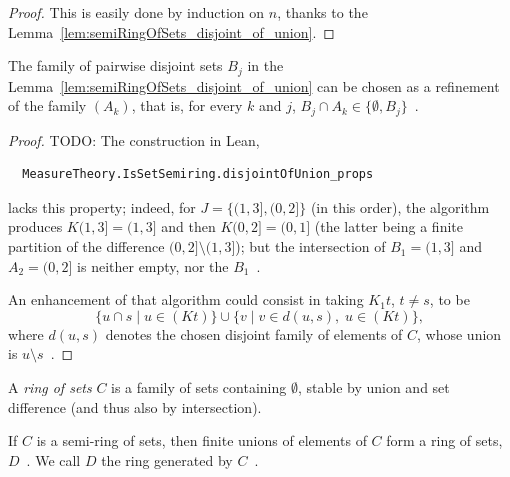 \begin{proof}\leanok
This is easily done by induction on $n$, thanks to the Lemma~\ref{lem:semiRingOfSets_disjoint_of_union}.
\end{proof}

\begin{lemma}\label{lem:semiRingOfSets_disjoint_of_union_finer}
  The family of pairwise disjoint sets $B_j$
  in the Lemma~\ref{lem:semiRingOfSets_disjoint_of_union}
  can be chosen
  as a refinement of the family $(A_k)$, that is,
  for every $k$ and $j$,
  $B_j \cap A_k \in \{\emptyset, B_j\}$~.
\end{lemma}

\begin{proof}
  TODO: The construction in Lean,
\begin{verbatim}
  MeasureTheory.IsSetSemiring.disjointOfUnion_props
\end{verbatim}
  lacks this property; indeed, for $J = \{ (1,3], (0,2] \}$ (in this order),
  the algorithm produces $K (1,3] = (1,3]$ and then $K (0,2] = (0,1]$
  (the latter being a finite partition of the difference $(0,2]\setminus(1,3]$);
  but the intersection of $B_1=(1,3]$ and $A_2=(0,2]$ is neither empty, nor the $B_1$~.

  An enhancement of that algorithm could consist in taking $K_1 t$, $t\neq s$,
  to be
  \[
  \{ u\cap s \mid u\in (K t)\}
  \cup
  \{ v \mid v\in d(u,s),\; u\in (K t)\},
  \]
  where $d(u,s)$ denotes the chosen disjoint family of elements of $C$, whose union
  is $u\setminus s$~.
\end{proof}

\begin{definition}\label{def:ringOfSets}
  \mathlibok
  A \emph{ring of sets} $C$ is a family of sets containing $\emptyset$,
  stable by union and set difference (and thus also by intersection).
\end{definition}

\begin{lemma}\label{lem:setRing_of_finiteUnions}
  \mathlibok
  If $C$ is a semi-ring of sets,
  then finite unions of elements of $C$ form a ring of sets, $D$~.
  We call $D$ the ring generated by $C$~.
\end{lemma}


